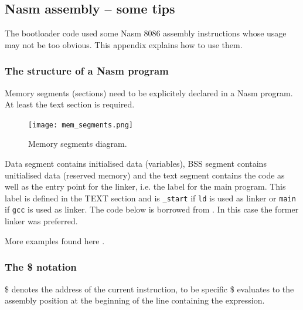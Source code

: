 \documentclass[a4paper]{article}
\begin{document}



\newpage
\subsection{Nasm assembly -- some tips}

The bootloader code used some Nasm 8086 assembly instructions whose usage may not be too obvious. This appendix explains how to use them.

\subsubsection{The structure of a Nasm program}

Memory segments (sections) need to be explicitely declared in a Nasm program. At least the text section is required.
\begin{figure}[H]
	\centering
	\texttt{[image: mem\_segments.png]}
	\caption{Memory segments diagram.}
	\label{fig:mem_segments}
\end{figure}

Data segment contains initialised data (variables), BSS segment contains unitialised data (reserved memory) and the text segment contains the code as well as the entry point for the linker, i.e. the label for the main program. This label is defined in the TEXT section and is \texttt{_start} if \texttt{ld} is used as linker or \texttt{main} if \texttt{gcc} is used as linker. The code below is borrowed from \cite{nasmtut}. In this case the former linker was preferred.




More examples found here \cite{nasmtut2}.


\subsubsection{The \$ notation}

\$ denotes the address of the current instruction, to be specific \$ evaluates to the assembly position at the beginning of the line containing the expression. 
\end{document}
